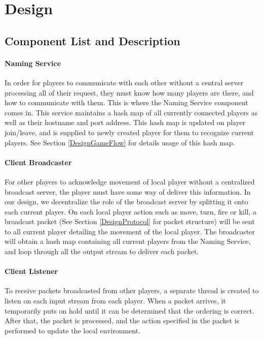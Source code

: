 \section{Design}\label{Design}

\subsection{Component List and Description}\label{DesignComponent}

\paragraph*{Naming Service}

In order for players to communicate with each other without a central server processing all of their request, they must know how many players are there, and how to communicate with them. This is where the Naming Service component comes in. This service maintains a hash map of all currently connected players as well as their hostname and port address. This hash map is updated on player join/leave, and is supplied to newly created player for them to recognize current players. See Section \ref{DesignGameFlow} for details usage of this hash map.

\paragraph*{Client Broadcaster}

For other players to acknowledge movement of local player without a centralized broadcast server, the player must have some way of deliver this information. In our design, we decentralize the role of the broadcast server by splitting it onto each current player. On each local player action such as move, turn, fire or kill, a broadcast packet (See Section \ref{DesignProtocol} for packet structure) will be sent to all current player detailing the movement of the local player. The broadcaster will obtain a hash map containing all current players from the Naming Service, and loop through all the output stream to deliver each packet.

\paragraph*{Client Listener}

To receive packets broadcasted from other players, a separate thread is created to listen on each input stream from each player. When a packet arrives, it temporarily puts on hold until it can be determined that the ordering is correct. After that, the packet is processed, and the action specified in the packet is performed to update the local environment.

